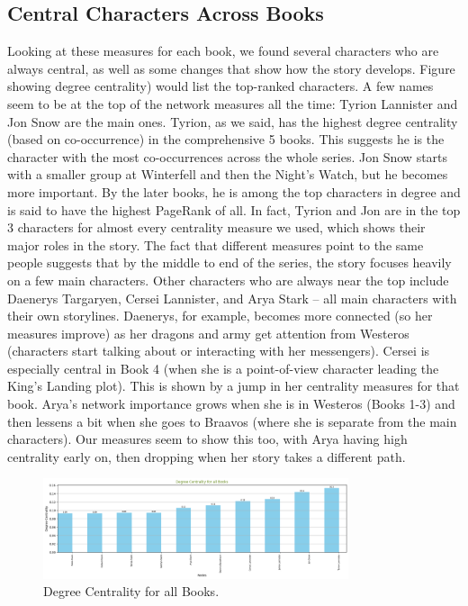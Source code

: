 \documentclass[12pt, a4paper]{article}
\begin{document}
\subsection*{Central Characters Across Books}
Looking at these measures for each book, we found several characters who are always central, as well as some changes that show how the story develops. Figure showing degree centrality) would list the top-ranked characters. A few names seem to be at the top of the network measures all the time: Tyrion Lannister and Jon Snow are the main ones. Tyrion, as we said, has the highest degree centrality (based on co-occurrence) in the comprehensive 5 books. This suggests he is the character with the most co-occurrences across the whole series. Jon Snow starts with a smaller group at Winterfell and then the Night's Watch, but he becomes more important. By the later books, he is among the top characters in degree and is said to have the highest PageRank of all. In fact, Tyrion and Jon are in the top 3 characters for almost every centrality measure we used, which shows their major roles in the story. The fact that different measures point to the same people suggests that by the middle to end of the series, the story focuses heavily on a few main characters. Other characters who are always near the top include Daenerys Targaryen, Cersei Lannister, and Arya Stark – all main characters with their own storylines. Daenerys, for example, becomes more connected (so her measures improve) as her dragons and army get attention from Westeros (characters start talking about or interacting with her messengers). Cersei is especially central in Book 4 (when she is a point-of-view character leading the King's Landing plot). This is shown by a jump in her centrality measures for that book. Arya's network importance grows when she is in Westeros (Books 1-3) and then lessens a bit when she goes to Braavos (where she is separate from the main characters). Our measures seem to show this too, with Arya having high centrality early on, then dropping when her story takes a different path.

\begin{figure}[htbp]
\centering
\includegraphics[width=0.8\textwidth]{deg-cent-all.png}
\caption{Degree Centrality for all Books.}
\label{fig:deg_cent_all}
\end{figure}
\end{document}

